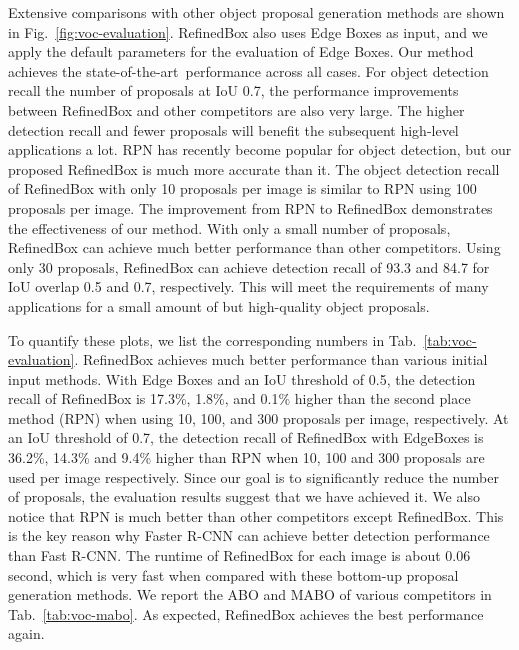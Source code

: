\documentclass[10pt,twocolumn,letterpaper]{article}
\newcommand{\figref}[1]{Fig.~\ref{#1}}
\newcommand{\tabref}[1]{Tab.~\ref{#1}}
\def\sArt{{state-of-the-art~}}
\begin{document}
Extensive comparisons with other object proposal generation methods
are shown in \figref{fig:voc-evaluation}.
RefinedBox also uses Edge Boxes as input,
and we apply the default parameters for the evaluation of Edge Boxes.
Our method achieves the \sArt performance across all cases.
%
%
For object detection recall \vs the number of proposals at IoU 0.7,
the performance improvements between RefinedBox and other competitors are also very large.
The higher detection recall and fewer proposals will benefit the subsequent
high-level applications a lot.
%
RPN has recently become popular for object detection,
but our proposed RefinedBox is much more accurate than it.
The object detection recall of RefinedBox with only 10 proposals per image
is similar to RPN using 100 proposals per image.
The improvement from RPN to RefinedBox demonstrates the effectiveness of our method.
%
With only a small number of proposals,
RefinedBox can achieve much better performance than other competitors.
Using only 30 proposals, RefinedBox can achieve detection recall of
93.3 and 84.7 for IoU overlap 0.5 and 0.7, respectively.
This will meet the requirements of many applications for a small amount
of but high-quality object proposals.


To quantify these plots, we list the corresponding numbers
in \tabref{tab:voc-evaluation}.
RefinedBox achieves much better performance than various initial
input methods.
With Edge Boxes and an IoU threshold of 0.5, the detection recall of 
RefinedBox is 17.3\%, 1.8\%, and 0.1\% higher than the second place 
method (RPN) when using 10, 100, and 300 proposals per image, respectively.
At an IoU threshold of 0.7, the detection recall of RefinedBox with EdgeBoxes
is 36.2\%, 14.3\% and 9.4\% higher than RPN when 10, 100 and 300 proposals
are used per image respectively.
Since our goal is to significantly reduce the number of proposals,
the evaluation results suggest that we have achieved it.
We also notice that RPN is much better than other competitors except RefinedBox.
This is the key reason why Faster R-CNN can achieve better detection performance
than Fast R-CNN.
The runtime of RefinedBox for each image is about 0.06 second,
which is very fast when compared with these bottom-up proposal generation methods.
%
We report the ABO and MABO of various competitors in \tabref{tab:voc-mabo}.
As expected, RefinedBox achieves the best performance again.
\end{document}
